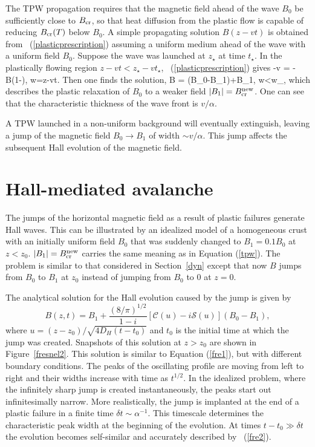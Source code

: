 The TPW
propagation requires that
the magnetic field ahead of the wave $B_0$ 
be sufficiently close to $B_{\rm cr}$, so that heat diffusion from the plastic flow 
is capable of reducing
$B_{\rm cr}(T)$
below $B_0$. A simple propagating solution $B(z-vt)$ is obtained from 
\Eq~(\ref{plasticprescription}) assuming a uniform medium ahead of the wave with 
a uniform field $B_0$. Suppose the wave was launched at $z_\star$ at time $t_\star$.
In the plastically flowing region $z-vt<z_\star-vt_\star$,
\Eq~(\ref{plasticprescription}) gives
\beq
-v  = -\alpha B\left(1-\right), 
\qquad w=z-vt.
\eeq
Then one finds the solution,
\beq\label{tpw}
B = (B_0-B_1)\exp{}+B_1,  \quad w<w_\star,
\eeq 
which describes the plastic relaxation of $B_0$ to a weaker field $|B_1|=B_{\rm cr}^{\rm new}$.
One can see that the characteristic thickness of the wave front is $v/\alpha$.

A TPW launched in a non-uniform background will eventually extinguish, leaving 
a jump of the magnetic field $B_0\rightarrow B_1$ of width $\sim v/\alpha$. This jump affects the subsequent Hall evolution of the magnetic field.

\section{Hall-mediated avalanche}\label{avalanche}

The jumps of the horizontal magnetic field as a result of plastic failures generate Hall waves.
This can be illustrated by an idealized model of a homogeneous crust with an initially uniform field $B_0$ that was suddenly changed to $B_1=0.1B_0$ at $z<z_0$. 
$|B_1|=B_{\rm cr}^{\rm new}$ carries the same meaning as in Equation (\ref{tpw}).
The problem is similar to that considered in Section~\ref{dyn} except that now $B$ jumps from $B_0$ to $B_1$ at $z_0$ instead of jumping from $B_0$ to $0$ at $z=0$.

The analytical solution for the Hall evolution caused by the jump is given by
\begin{equation}\label{fre2}
B(z,t)=B_1+ \frac{(8/\pi)^{1/2}}{1-i}\left[\mathcal{C}(u)-i\mathcal{S}(u)\right](B_0-B_1),
\end{equation}
where $u = (z-z_0)/\sqrt{4D_H (t-t_0)}$ and $t_0$ is the initial time at which the jump was created. 
Snapshots of this solution at $z>z_0$ are shown in Figure~\ref{fresnel2}.
This solution is similar to Equation (\ref{fre1}), but with different boundary conditions.
The peaks of the oscillating profile are moving from left to right and their widths increase with time as $t^{1/2}$. 
In the idealized problem, where the infinitely sharp jump is created instantaneously, the peaks start out infinitesimally narrow.
More realistically, the jump is implanted at the end of a plastic failure in a finite time $\delta t\sim \alpha^{-1}$. This timescale determines the characteristic peak width at the beginning of the evolution. 
At times $t-t_0\gg\delta t$ the evolution becomes self-similar and accurately described by \Eq~(\ref{fre2}).


